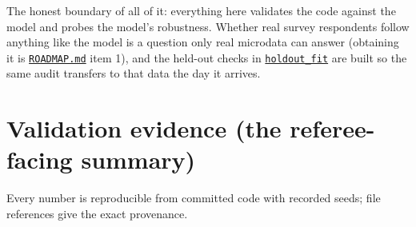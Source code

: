 \documentclass[11pt]{article}
\newcommand{\repo}{https://github.com/welfareweights/engine}
\newcommand{\src}[1]{\href{\repo/blob/main/#1}{\texttt{#1}}}
\newcommand{\fn}[1]{\href{https://github.com/search?q=repo\%3Awelfareweights\%2Fengine+symbol\%3A#1\&type=code}{\texttt{#1}}}
\begin{document}
The honest boundary of all of it: everything here validates the code against the model and probes the model's robustness. Whether real survey respondents follow anything like the model is a question only real microdata can answer (obtaining it is \src{ROADMAP.md} item 1), and the held-out checks in \fn{holdout\_fit} are built so the same audit transfers to that data the day it arrives.

\appendix

\section{Validation evidence (the referee-facing summary)}\label{app:validation}

Every number is reproducible from committed code with recorded seeds; file references give the exact provenance.
\end{document}
